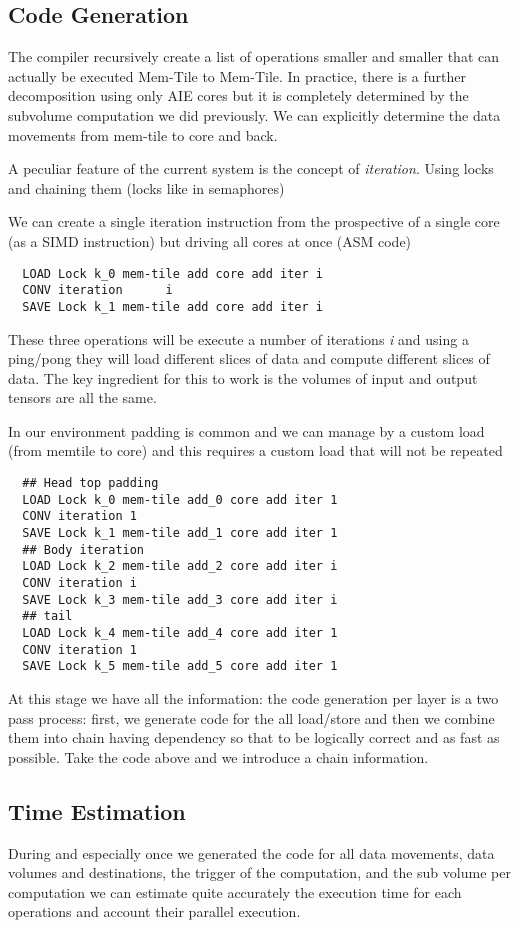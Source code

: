 \documentclass[conference]{IEEEtran}
\begin{document}
\subsection{Code Generation }
The compiler recursively create a list of operations smaller and
smaller that can actually be executed Mem-Tile to Mem-Tile. In
practice, there is a further decomposition using only AIE cores but it
is completely determined by the subvolume computation we did
previously. We can explicitly determine the data movements from
mem-tile to core and back.

A peculiar feature of the current system is the concept of {\em
  iteration}. Using locks and chaining them (locks like in
semaphores)

We can create a single iteration instruction from the prospective of a
single core (as a SIMD instruction) but driving all cores at once (ASM
code) {\footnotesize
\begin{verbatim}
  LOAD Lock k_0 mem-tile add core add iter i
  CONV iteration      i
  SAVE Lock k_1 mem-tile add core add iter i
\end{verbatim}
}
These three operations will be execute a number of iterations {\em i}
and using a ping/pong they will load different slices of data and
compute different slices of data. The key ingredient for this to work
is the volumes of input and output tensors are all the same. 

In our environment padding is common and we can manage by a custom
load (from memtile to core) and this requires a custom load that will
not be repeated
{\footnotesize
\begin{verbatim}
  ## Head top padding
  LOAD Lock k_0 mem-tile add_0 core add iter 1
  CONV iteration 1
  SAVE Lock k_1 mem-tile add_1 core add iter 1
  ## Body iteration
  LOAD Lock k_2 mem-tile add_2 core add iter i
  CONV iteration i
  SAVE Lock k_3 mem-tile add_3 core add iter i
  ## tail
  LOAD Lock k_4 mem-tile add_4 core add iter 1
  CONV iteration 1
  SAVE Lock k_5 mem-tile add_5 core add iter 1
\end{verbatim}
 }




At this stage we have all the information: the code generation per
layer is a two pass process: first, we generate code for the all
load/store and then we combine them into chain having dependency so
that to be logically correct and as fast as possible. Take the code
above and we introduce a chain information. 

\subsection{Time Estimation}
During and especially once we generated the code for all data
movements, data volumes and destinations, the trigger of the
computation, and the sub volume per computation we can estimate quite
accurately the execution time for each operations and account their
parallel execution.
\end{document}
